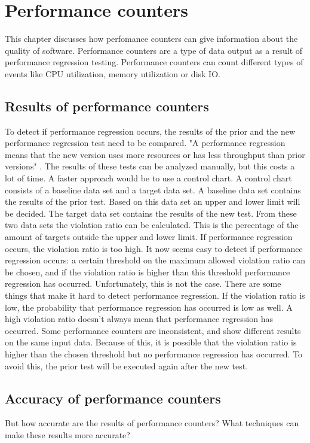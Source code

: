 \section{Performance counters}

This chapter discusses how perfomance counters can give information about the quality of software. Performance counters are a type of data output as a result of performance regression testing. Performance counters can count different types of events like CPU utilization, memory utilization or disk IO.

\subsection{Results of performance counters}
To detect if performance regression occurs, the results of the prior and the new performance regression test need to be compared. "A performance regression means that the new version uses more resources or has less throughput than prior versions" \cite{DetectionPerformanceRegression}. The results of these tests can be analyzed manually, but this costs a lot of time. A faster approach would be to use a control chart. A control chart consists of a baseline data set and a target data set. A baseline data set contains the results of the prior test. Based on this data set an upper and lower limit will be decided. The target data set contains the results of the new test. From these two data sets the violation ratio can be calculated. This is the percentage of the amount of targets outside the upper and lower limit. If performance regression occurs, the violation ratio is too high. It now seems easy to detect if performance regression occurs: a certain threshold on the maximum allowed violation ratio can be chosen, and if the violation ratio is higher than this threshold performance regression has occurred. Unfortunately, this is not the case. There are some things that make it hard to detect performance regression. If the violation ratio is low, the probability that performance regression has occurred is low as well. A high violation ratio doesn't always mean that performance regression has occurred. Some performance counters are inconsistent, and show different results on the same input data. Because of this, it is possible that the violation ratio is higher than the chosen threshold but no performance regression has occurred. To avoid this, the prior test will be executed again after the new test.

\subsection{Accuracy of performance counters}
But how accurate are the results of performance counters? What techniques can make these results more accurate?

